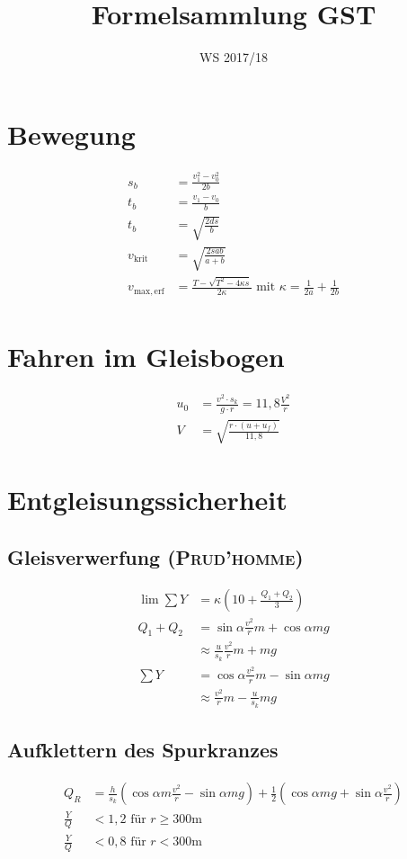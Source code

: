 \documentclass{scrartcl}
\title{Formelsammlung GST}
\date{WS 2017/18}
\begin{document}
	\maketitle
	\section{Bewegung}
	\begin{align*}
		s_b &= \frac{v_1^2 - v_0^2}{2b} \\
		t_b &= \frac{v_1 - v_0}{b} \\
		t_b &= \sqrt{\frac{2ds}{b}} \\
		v_\mathrm{krit} &= \sqrt{\frac{2sab}{a+b}} \\
		v_\mathrm{max,erf} &= \frac{T-\sqrt{T^2-4\kappa{}s}}{2\kappa} \text{ mit } \kappa = \frac{1}{2a}+\frac{1}{2b} \\
	\end{align*}

	\section{Fahren im Gleisbogen}
	\begin{align*}
		u_0 &= \frac{v^2 \cdot s_k}{g\cdot r} = 11,8\frac{V^2}{r} \\
		V &= \sqrt{\frac{r\cdot(u+u_f)}{11,8}}
	\end{align*}

	\section{Entgleisungssicherheit}
	\subsection{Gleisverwerfung (\textsc{Prud'homme})}
	\begin{align*}
		\lim\sum{}Y &= \kappa\left(10+\frac{Q_1+Q_2}{3}\right) \\
		Q_1+Q_2 &= \sin\alpha\frac{v^2}{r}m+\cos\alpha{}mg \\
						&\approx \frac{u}{s_k}\frac{v^2}{r}m+mg \\
		\sum{}Y &= \cos\alpha\frac{v^2}{r}m-\sin\alpha{}mg \\
						&\approx \frac{v^2}{r}m - \frac{u}{s_k}mg
	\end{align*}

	\subsection{Aufklettern des Spurkranzes}
	\begin{align*}
		Q_R &= \frac{h}{s_k} (\cos\alpha{}m\frac{v^2}{r}-\sin\alpha{}mg) + \frac{1}{2}(\cos\alpha{}mg + \sin\alpha{}\frac{v^2}{r}) \\
		\frac{Y}{Q} &< 1,2 \text{ für } r\geq300\mathrm{m} \\
		\frac{Y}{Q} &< 0,8 \text{ für } r<300\mathrm{m}
	\end{align*}
\end{document}
